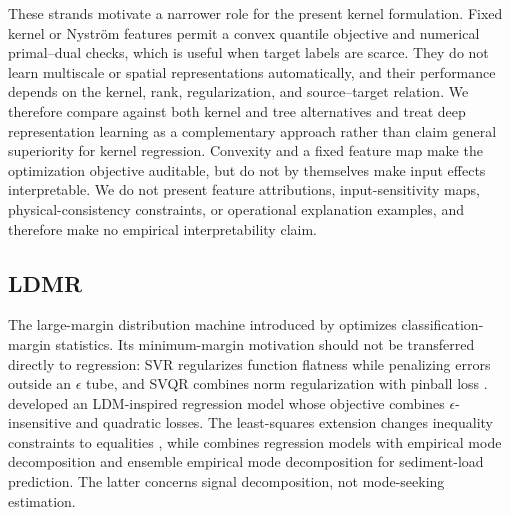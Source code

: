 \documentclass[a4paper]{cas-sc}
\begin{document}
{\color{blue}These strands motivate a narrower role for the present kernel formulation. Fixed kernel or Nystr\"{o}m features permit a convex quantile objective and numerical primal--dual checks, which is useful when target labels are scarce. They do not learn multiscale or spatial representations automatically, and their performance depends on the kernel, rank, regularization, and source--target relation. We therefore compare against both kernel and tree alternatives and treat deep representation learning as a complementary approach rather than claim general superiority for kernel regression. Convexity and a fixed feature map make the optimization objective auditable, but do not by themselves make input effects interpretable. We do not present feature attributions, input-sensitivity maps, physical-consistency constraints, or operational explanation examples, and therefore make no empirical interpretability claim.}

\subsection{LDMR}
{\color{blue}The large-margin distribution machine introduced by \citet{zhang2014large} optimizes classification-margin statistics. Its minimum-margin motivation should not be transferred directly to regression: SVR regularizes function flatness while penalizing errors outside an $\epsilon$ tube, and SVQR combines norm regularization with pinball loss \citep{smola2004tutorial,takeuchi2006nonparametric}. \citet{rastogi2020ldmr} developed an LDM-inspired regression model whose objective combines $\epsilon$-insensitive and quadratic losses. The least-squares extension changes inequality constraints to equalities \citep{gupta2021least}, while \citet{hazarika2023mode} combines regression models with empirical mode decomposition and ensemble empirical mode decomposition for sediment-load prediction. The latter concerns signal decomposition, not mode-seeking estimation.}
\end{document}
